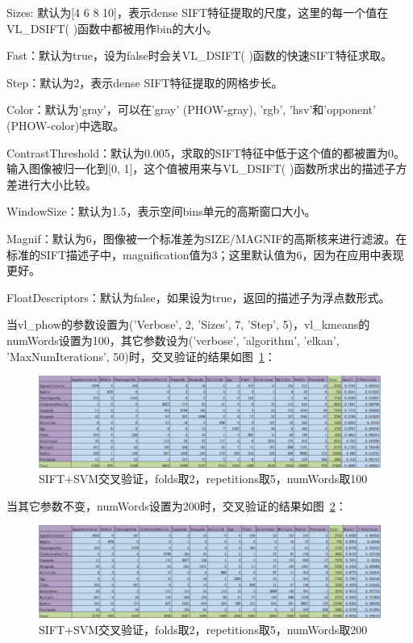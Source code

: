 \documentclass[12pt]{article}
\begin{document}
\begin{enumerate}
\begin{itemize}
Sizes: 默认为[4 6 8 10]，表示dense SIFT特征提取的尺度，这里的每一个值在VL\_DSIFT( )函数中都被用作bin的大小。

Fast：默认为true，设为false时会关VL\_DSIFT( )函数的快速SIFT特征求取。

Step：默认为2，表示dense SIFT特征提取的网格步长。

Color：默认为'gray'，可以在'gray' (PHOW-gray), 'rgb', 'hsv'和'opponent' (PHOW-color)中选取。

ContrastThreshold：默认为0.005，求取的SIFT特征中低于这个值的都被置为0。输入图像被归一化到[0, 1]，这个值被用来与VL\_DSIFT( )函数所求出的描述子方差进行大小比较。

WindowSize：默认为1.5，表示空间bins单元的高斯窗口大小。

Magnif：默认为6，图像被一个标准差为SIZE/MAGNIF的高斯核来进行滤波。在标准的SIFT描述子中，magnification值为3；这里默认值为6，因为在应用中表现更好。

FloatDescriptors：默认为false，如果设为true，返回的描述子为浮点数形式。

当vl\_phow的参数设置为('Verbose', 2, 'Sizes', 7, 'Step', 5)，vl\_kmeans的numWords设置为100，其它参数设为('verbose', 'algorithm', 'elkan', 'MaxNumIterations', 50)时，交叉验证的结果如图~\ref{fig: SIFT-SVM-2-folds-5-repetitions-100}：

\begin{figure}[!ht]
\centering
\includegraphics[width=1.0\linewidth]{SIFT-SVM-2-folds-5-repetitions-100}
\caption{SIFT+SVM交叉验证，folds取2，repetitions取5，numWords取100}
\label{fig: SIFT-SVM-2-folds-5-repetitions-100}
\end{figure}

当其它参数不变，numWords设置为200时，交叉验证的结果如图~\ref{fig: SIFT-SVM-2-folds-5-repetitions-200}：

\begin{figure}[!ht]
\centering
\includegraphics[width=1.0\linewidth]{SIFT-SVM-2-folds-5-repetitions-200}
\caption{SIFT+SVM交叉验证，folds取2，repetitions取5，numWords取200}
\label{fig: SIFT-SVM-2-folds-5-repetitions-200}
\end{figure}


\end{itemize}
\end{enumerate}
\end{document}
